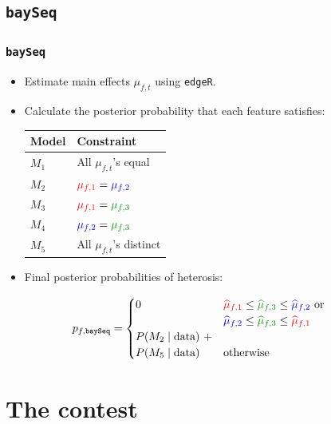 \documentclass[handout]{beamer}
\providecommand{\wh}[1]{\widehat{#1}}
\numberwithin{equation}{section}
\begin{document}
\subsection{{\tt baySeq}}

\begin{frame}
\frametitle{{\tt baySeq}}
\begin{itemize}
\item Estimate main effects $\mu_{f, t}$ using {\tt edgeR}.
\pause \item Calculate the posterior probability that each feature satisfies:

\begin{center}
\begin{tabular}{l|l}
Model & Constraint \\ \hline
$M_1$ & All $\mu_{f, t}$'s equal \\
$M_2$ &  ${\color{red}\mu_{f, 1}} = {\color{blue}\mu_{f, 2}}$ \\
$M_3$ & ${\color{red}\mu_{f, 1}} = {\color{dkgreen}\mu_{f, 3}}$ \\
$M_4$ & ${\color{blue}\mu_{f, 2}} = {\color{dkgreen}\mu_{f, 3}}$ \\
$M_5$ &  All $\mu_{f, t}$'s distinct
\end{tabular}
\end{center}

\pause \item Final posterior probabilities of heterosis:

\end{itemize}

\begin{align*}
p_{f, \text{{\tt baySeq}}} &= \begin{cases}
0 & {\color{red}\wh{\mu}_{f, 1}} \le {\color{dkgreen}\wh{\mu}_{f, 3}} \le {\color{blue}\wh{\mu}_{f, 2}}$ or $ \\
& {\color{blue}\wh{\mu}_{f, 2}} \le {\color{dkgreen}\wh{\mu}_{f, 3}} \le {\color{red}\wh{\mu}_{f, 1}} \\
P(M_2 \mid \text{data}) \ + \\ P(M_5 \mid \text{data}) & \text{otherwise}
\end{cases}
\end{align*}

\end{frame}

\section{The contest}
\end{document}
